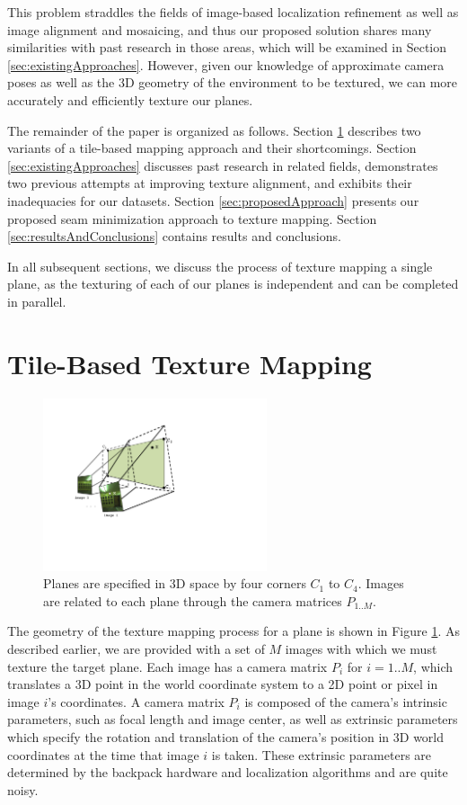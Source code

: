\documentclass[10pt,twocolumn,letterpaper]{article}
\begin{document}
This problem straddles the fields of image-based localization
refinement as well as image alignment and mosaicing, and thus our
proposed solution shares many similarities with past research in those
areas, which will be examined in Section \ref{sec:existingApproaches}. However, given our knowledge of approximate camera poses as well as the 3D geometry of the environment to be textured, we can more accurately and efficiently texture our planes.

The remainder of the paper is organized as follows. Section
\ref{sec:simpleTextureMapping} describes two variants of a tile-based
mapping approach and their shortcomings.  Section
\ref{sec:existingApproaches} discusses past research in related
fields, demonstrates two previous attempts at improving texture
alignment, and exhibits their inadequacies for our datasets. Section
\ref{sec:proposedApproach} presents our proposed seam minimization
approach to texture mapping. Section \ref{sec:resultsAndConclusions}
contains results and conclusions.

In all subsequent sections, we discuss the process of texture mapping
a single plane, as the texturing of each of our planes is independent
and can be completed in parallel.

\section{Tile-Based Texture Mapping}
\label{sec:simpleTextureMapping}
\begin{figure}
  \centering
  \includegraphics[height=2in]{Projection.pdf}
  \caption{Planes are specified in 3D space by four corners $C_1$ to
    $C_4$. Images are related to each plane through the camera
    matrices $P_{1..M}$. }
  \label{fig:projection}
\end{figure}

The geometry of the texture mapping process for a plane is shown in
Figure \ref{fig:projection}.  As described earlier, we are provided
with a set of $M$ images with which we must texture the target
plane. Each image has a camera matrix $P_i$ for $i=1..M$, which
translates a 3D point in the world coordinate system to a 2D point or
pixel in image $i$'s coordinates. A camera matrix $P_i$ is composed of
the camera's intrinsic parameters, such as focal length and image
center, as well as extrinsic parameters which specify the rotation and
translation of the camera's position in 3D world coordinates at the
time that image $i$ is taken. These extrinsic parameters are
determined by the backpack hardware and localization algorithms
\cite{chen2010indoor, liu2010indoor, kua2012loopclosure} and are quite
noisy.
\end{document}
